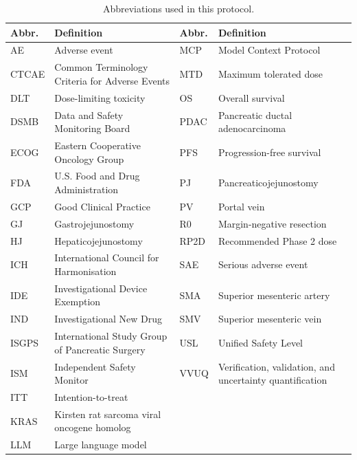 \begin{table}[htbp]
\centering
\footnotesize
\caption{Abbreviations used in this protocol.}
\label{tab:abbrev}
\begin{tabularx}{\textwidth}{L{1.8cm} Y L{1.8cm} Y}
\toprule
\textbf{Abbr.} & \textbf{Definition} & \textbf{Abbr.} & \textbf{Definition} \\
\midrule
AE    & Adverse event                                  & MCP  & Model Context Protocol \\
CTCAE & Common Terminology Criteria for Adverse Events  & MTD  & Maximum tolerated dose \\
DLT   & Dose-limiting toxicity                          & OS   & Overall survival \\
DSMB  & Data and Safety Monitoring Board                & PDAC & Pancreatic ductal adenocarcinoma \\
ECOG  & Eastern Cooperative Oncology Group              & PFS  & Progression-free survival \\
FDA   & U.S. Food and Drug Administration               & PJ   & Pancreaticojejunostomy \\
GCP   & Good Clinical Practice                          & PV   & Portal vein \\
GJ    & Gastrojejunostomy                               & R0   & Margin-negative resection \\
HJ    & Hepaticojejunostomy                             & RP2D & Recommended Phase 2 dose \\
ICH   & International Council for Harmonisation         & SAE  & Serious adverse event \\
IDE   & Investigational Device Exemption                & SMA  & Superior mesenteric artery \\
IND   & Investigational New Drug                        & SMV  & Superior mesenteric vein \\
ISGPS & International Study Group of Pancreatic Surgery & USL  & Unified Safety Level \\
ISM   & Independent Safety Monitor                      & VVUQ & Verification, validation, and uncertainty quantification \\
ITT   & Intention-to-treat                              &      & \\
KRAS  & Kirsten rat sarcoma viral oncogene homolog      &      & \\
LLM   & Large language model                            &      & \\
\bottomrule
\end{tabularx}
\end{table}

